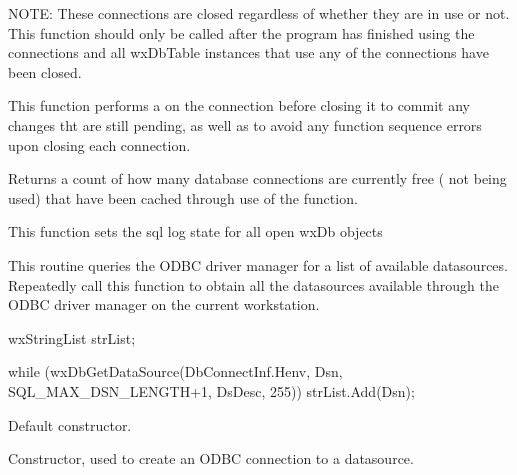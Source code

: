 NOTE: These connections are closed regardless of whether they are in use 
or not.  This function should only be called after the program has 
finished using the connections and all wxDbTable instances that use any of 
the connections have been closed.

This function performs a  
on the connection before closing it to commit any changes tht are still 
pending, as well as to avoid any function sequence errors upon closing 
each connection.




Returns a count of how many database connections are currently free ( not 
being used) that have been cached through use of the  
function.




This function sets the sql log state for all open wxDb objects




This routine queries the ODBC driver manager for a list of available 
datasources.  Repeatedly call this function to obtain all the datasources 
available through the ODBC driver manager on the current workstation.

    wxStringList strList;

    while (wxDbGetDataSource(DbConnectInf.Henv, Dsn, SQL_MAX_DSN_LENGTH+1, DsDesc, 255))
        strList.Add(Dsn);



\label{wxdbconstr}


Default constructor.


Constructor, used to create an ODBC connection to a datasource.


